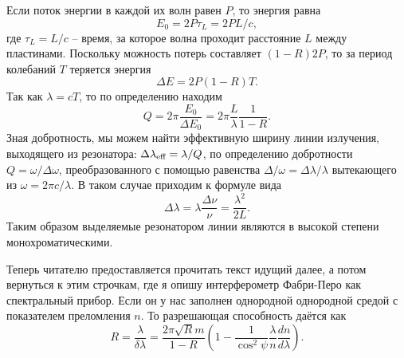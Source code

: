 Если поток энергии в каждой их волн равен $P$, то энергия равна 
\begin{equation*}
    E_0 = 2 P \tau_L = 2 P L/c,
\end{equation*}
где $\tau_L = L/c$ -- время, за которое волна проходит расстояние $L$ между пластинами. Поскольку можность потерь составляет $(1-R) 2 P$, то за период колебаний $T$ теряется энергия 
\begin{equation*}
    \Delta E = 2 P (1-R) T.
\end{equation*}
Так как $\lambda = c T$, то по определению находим
\begin{equation*}
    Q = 2 \pi \frac{E_0}{\Delta E_0} = 2 \pi \frac{L}{\lambda} \frac{1}{1-R}.
\end{equation*}
Зная добротность, мы можем найти эффективную ширину линии излучения, выходящего из резонатора:
$\Delta \lambda_{\textnormal{eff}} = \lambda/Q$, по определению добротности $Q = \omega / \Delta \omega$, преобразованного с помощью равенства $\Delta/\omega = \Delta \lambda/\lambda$ вытекающего из $\omega = 2 \pi c / \lambda$. В таком случае приходим к формуле вида
\begin{equation*}
    \Delta \lambda = \lambda \frac{\Delta \nu}{\nu} = \frac{\lambda^2}{2L}.
\end{equation*}
Таким образом выделяемые резонатором линии являются в высокой степени монохроматическими. 

Теперь читателю предоставляется прочитать текст идущий далее, а потом вернуться к этим строчкам, где я опишу интерферометр Фабри-Перо как спектральный прибор.
Если он у нас заполнен однородной однородной средой с показателем преломления $n$. То разрешающая способность даётся как
\begin{equation*}
    R = \frac{\lambda}{\delta\lambda} = \frac{2 \pi \sqrt{R} m}{1 - R}\left(1 - \frac{1}{\cos^2 \psi} \frac{\lambda}{n} \frac{d n}{d \lambda}\right).
\end{equation*}